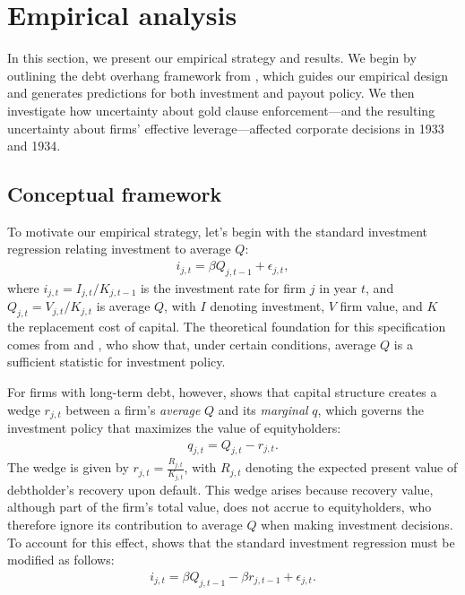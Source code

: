 \section{Empirical analysis}
\label{sec:main_results}
\noindent In this section, we present our empirical strategy and results. We begin by outlining the debt overhang framework from \cite{Hennessy2004}, which guides our empirical design and generates predictions for both investment and payout policy. We then investigate how uncertainty about gold clause enforcement---and the resulting uncertainty about firms' effective leverage---affected corporate decisions in 1933 and 1934.

\subsection{Conceptual framework}
\label{sec:concept}
\noindent To motivate our empirical strategy, let's begin with the standard investment regression relating investment to average $Q$:
\begin{align}
\label{eq:classic_inv_reg}
i_{j,t} = \beta Q_{j,t-1} + \epsilon_{j,t},
\end{align}
where $i_{j,t} = I_{j,t}/K_{j,t-1}$ is the investment rate for firm $j$ in year $t$, and $Q_{j,t} = V_{j,t}/K_{j,t}$ is average $Q$, with $I$ denoting investment, $V$ firm value, and $K$ the replacement cost of capital. The theoretical foundation for this specification comes from \cite{Hayashi1982} and \cite{Abel1994}, who show that, under certain conditions, average $Q$ is a sufficient statistic for investment policy.

For firms with long-term debt, however, \cite{Hennessy2004} shows that capital structure creates a wedge $r_{j,t}$ between a firm's \textit{average} $Q$ and its \textit{marginal} $q$, which governs the investment policy that maximizes the value of equityholders:
\begin{align}
\label{eq:overhang_wedge}
q_{j,t} = Q_{j,t} - r_{j,t}.
\end{align}
The wedge is given by $r_{j,t} = \frac{R_{j,t}}{K_{j,t}}$, with $R_{j,t}$ denoting the expected present value of debtholder's recovery upon default. This wedge arises because recovery value, although part of the firm's total value, does not accrue to equityholders, who therefore ignore its contribution to average $Q$ when making investment decisions. To account for this effect, \cite{Hennessy2004} shows that the standard investment regression must be modified as follows:
\begin{align}
\label{eq:overhang_inv_reg}
i_{j,t} = \beta Q_{j,t-1} - \beta r_{j,t-1} + \epsilon_{j,t}.
\end{align}

